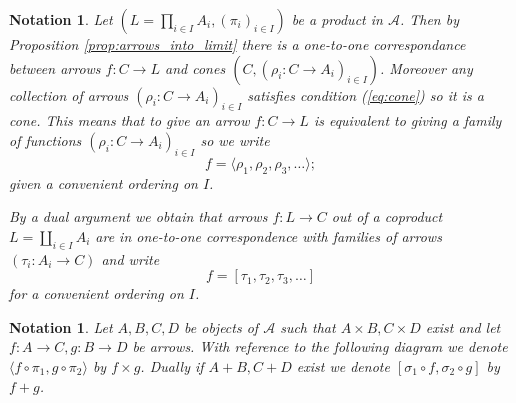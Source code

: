\documentclass[letterpaper, 11pt, oneside]{memoir}
\theoremstyle{myteo}
\newtheorem{notation}[theorem]{Notation}
\numberwithin{equation}{section}
\newcommand{\marginnote}[1]{\marginpar{\footnotesize #1}}
\newcommand{\A}{\mathscr{A}}
\begin{document}
\begin{notation}
  \label{not:brackets}
  Let \((L = \prod_{i\in I}A_i, (\pi_i)_{i \in I})\) be a product in \(\A\).
  Then by Proposition \ref{prop:arrows_into_limit} there is a one-to-one correspondance between arrows \(f \colon C \to L\) and cones \((C, (\rho_i\colon C \to A_i)_{i \in I})\).
  Moreover any collection of arrows \((\rho_i \colon C \to A_i)_{i \in I}\) satisfies condition (\ref{eq:cone}) so it is a cone.
  This means that to give an arrow \(f \colon C \to L\) is equivalent to giving a family of functions \((\rho_i \colon C \to A_i)_{i \in I}\) so we write
  \begin{equation}
    f = \langle\rho_1, \rho_2, \rho_3, \ldots\rangle;
  \end{equation}
  given a convenient ordering on \(I\).

  By a dual argument we obtain that arrows \(f \colon L \to C\) out of a coproduct \(L = \coprod_{i \in I}A_i\) are in one-to-one correspondence with families of arrows \((\tau_i \colon A_i \to C)\) and write
  \begin{equation}
    f = [\tau_1, \tau_2, \tau_3, \ldots]
  \end{equation}
  for a convenient ordering on \(I\).
\end{notation}

\begin{notation}
  \label{not:product_arrows}
  Let \(A,B,C,D\) be objects of \(\A\) such that \(A \times B, C \times D\) exist and let \(f \colon A \to C, g \colon B \to D\) be arrows.
  With reference to the following diagram we denote \(\langle f \circ \pi_1, g \circ \pi_2\rangle\) by \(f \times g\).
  Dually if \(A + B, C + D\) exist we denote \([\sigma_1 \circ f, \sigma_2 \circ g]\) by \(f + g\).
  \marginnote{\(f \times g\), \(f + g\)}
  \begin{center}
    \quad
  \end{center}
\end{notation}
\end{document}
